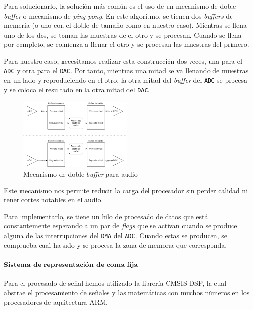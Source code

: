 Para solucionarlo, la solución más común es el uso de un mecanismo de doble \textit{buffer} o mecanismo de \textit{ping-pong}. En este algoritmo, se tienen dos \textit{buffers} de memoria (o uno con el doble de tamaño como en nuestro caso). Mientras se llena uno de los dos, se toman las muestras de el otro y se procesan. Cuando se llena por completo, se comienza a llenar el otro y se procesan las muestras del primero. \cite{PingPongBuffer}

Para nuestro caso, necesitamos realizar esta construcción dos veces, una para el \texttt{ADC} y otra para el \texttt{DAC}. Por tanto, mientras una mitad se va llenando de muestras en un lado y reproduciendo en el otro, la otra mitad del \textit{buffer} del \texttt{ADC} se procesa y se coloca el resultado en la otra mitad del \texttt{DAC}.

\begin{figure}[h]
    \centering
    \includegraphics[width=0.5\textwidth]{images/3/3-2/DSP/doubleBuffer.png}
    \caption{Mecanismo de doble \textit{buffer} para audio}
    \label{fig:double-buffer}
\end{figure}

Este mecanismo nos permite reducir la carga del procesador sin perder calidad ni tener cortes notables en el audio.

Para implementarlo, se tiene un hilo de procesado de datos que está constantemente esperando a un par de \textit{flags} que se activan cuando se produce alguna de las interrupciones del \texttt{DMA} del \texttt{ADC}. Cuando estas se producen, se comprueba cual ha sido y se procesa la zona de memoria que corresponda.

\paragraph{Sistema de representación de coma fija}

Para el procesado de señal hemos utilizado la librería CMSIS DSP, la cual abstrae el procesamiento de señales y las matemáticas con muchos números en los procesadores de aquitectura ARM. \cite{CMSISDSPSoftware}


